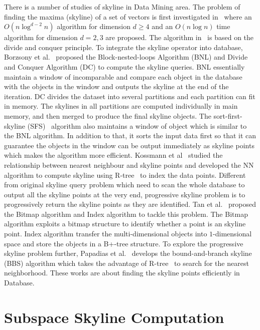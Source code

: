 There is a number of studies of skyline in Data Mining area. The problem of finding the maxima (skyline) of a set of vectors is first investigated in~\cite{kung1975finding} where an $O(n\log ^{d-2}n)$ algorithm for dimension $d\geq 4$ and an $O(n\log n)$ time algorithm for dimension $d = 2, 3$ are proposed. The algorithm in~\cite{kung1975finding} is based on the divide and conquer principle. To integrate the skyline operator into database, Borzsony et al.~\cite{borzsony2001skyline} proposed the Block-nested-loops Algorithm (BNL) and Divide and Conquer Algorithm (DC) to compute the skyline queries. BNL essentially maintain a window of incomparable and compare each object in the database with the objects in the window and outputs the skyline at the end of the iteration. DC divides the dataset into several partitions and each partition can fit in memory. The skylines in all partitions are computed individually in main memory, and then merged to produce the final skyline objects. 
The sort-first-skyline (SFS)~\cite{chomicki2003skyline} algorithm also maintains a window of object which is similar to the BNL algorithm. In addition to that, it sorts the input data first so that it can guarantee the objects in the window can be output immediately as skyline points which makes the algorithm more efficient.
Kossmann et al~\cite{kossmann2002shooting} studied the relationship between nearest neighbour and skyline points and developed the NN algorithm to compute skyline using R-tree~\cite{beckmann1990r} to index the data points.
Different from original skyline query problem which need to scan the whole database to output all the skyline points at the very end, progressive skyline problem is to progressively return the skyline points as they are identified. Tan et al.~\cite{tan2001efficient} proposed the Bitmap algorithm and Index algorithm to tackle this problem. The Bitmap algorithm exploits a bitmap structure to identify whether a point is an skyline point. Index algorithm transfer the multi-dimensional objects into $1$-dimensional space and store the objects in a B+-tree structure. To explore the progressive skyline problem further, Papadias et al.~\cite{ papadias2003optimal, papadias2005progressive} develops the bound-and-branch skyline (BBS) algorithm which takes the advantage of R-tree~\cite{beckmann1990r} to search for the nearest neighborhood. These works are about finding the skyline points efficiently in Database.

\section{Subspace Skyline Computation}
\label{sec:rel:subspace}

